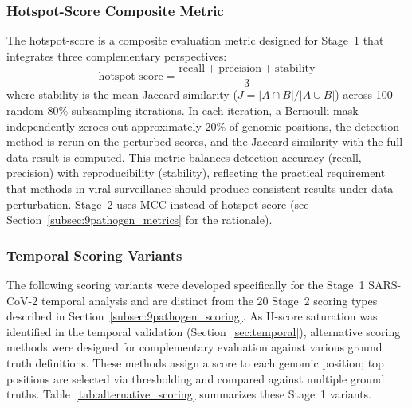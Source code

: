 \subsubsection{Hotspot-Score Composite Metric}
\label{subsec:hotspot_score}

The hotspot-score is a composite evaluation metric designed for Stage~1 that integrates three complementary perspectives:
\begin{equation}
\text{hotspot-score} = \frac{\text{recall} + \text{precision} + \text{stability}}{3}
\label{eq:hotspot_score}
\end{equation}
where stability is the mean Jaccard similarity ($J = |A \cap B| / |A \cup B|$) across 100 random 80\% subsampling iterations.
In each iteration, a Bernoulli mask independently zeroes out approximately 20\% of genomic positions, the detection method is rerun on the perturbed scores, and the Jaccard similarity with the full-data result is computed.
This metric balances detection accuracy (recall, precision) with reproducibility (stability), reflecting the practical requirement that methods in viral surveillance should produce consistent results under data perturbation.
Stage~2 uses MCC instead of hotspot-score (see Section~\ref{subsec:9pathogen_metrics} for the rationale).

\subsubsection{Temporal Scoring Variants}
\label{subsec:alternative_scoring}

The following scoring variants were developed specifically for the Stage~1 SARS-CoV-2 temporal analysis and are distinct from the 20 Stage~2 scoring types described in Section~\ref{subsec:9pathogen_scoring}.
As H-score saturation was identified in the temporal validation (Section~\ref{sec:temporal}), alternative scoring methods were designed for complementary evaluation against various ground truth definitions.
These methods assign a score to each genomic position; top positions are selected via thresholding and compared against multiple ground truths.
Table~\ref{tab:alternative_scoring} summarizes these Stage~1 variants.

